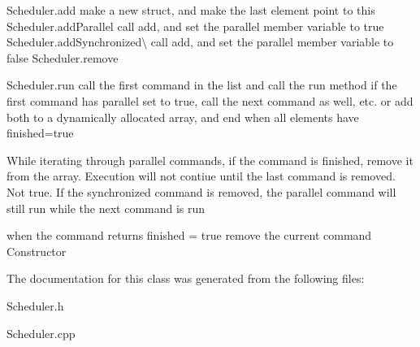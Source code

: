 Scheduler.\+add make a new struct, and make the last element point to this Scheduler.\+add\+Parallel call add, and set the parallel member variable to true Scheduler.\+add\+Synchronized\textbackslash{} call add, and set the parallel member variable to false Scheduler.\+remove

Scheduler.\+run call the first command in the list and call the run method if the first command has parallel set to true, call the next command as well, etc. or add both to a dynamically allocated array, and end when all elements have finished=true

While iterating through parallel commands, if the command is finished, remove it from the array. Execution will not contiue until the last command is removed. Not true. If the synchronized command is removed, the parallel command will still run while the next command is run

when the command returns finished = true remove the current command Constructor 

The documentation for this class was generated from the following files\+:\begin{DoxyCompactItemize}
\item 
Scheduler.\+h\item 
Scheduler.\+cpp\end{DoxyCompactItemize}
